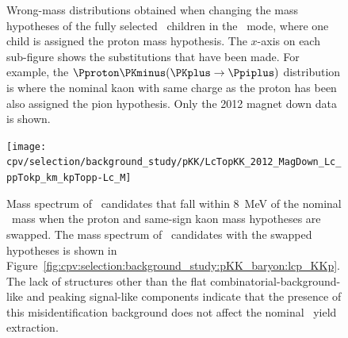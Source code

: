 \begin{figure}
  \caption{%
    Wrong-mass distributions obtained when changing the mass hypotheses of the 
    fully selected \PLambdac\ children in the \pKK\ mode, where one child is 
    assigned the proton mass hypothesis.
    The $x$-axis on each sub-figure shows the substitutions that have been 
    made.
    For example, the ${\Pproton\PKminus(\PKplus \to \Ppiplus)}$ distribution is where the 
    nominal kaon with same charge as the proton has been also assigned the pion 
    hypothesis.
    Only the 2012 magnet down data is shown.
  }
  \label{fig:cpv:selection:background_study:pKK_baryon}
\end{figure}

\begin{figure}
  \centering
  \texttt{[image: cpv/selection/background\_study/pKK/LcTopKK\_2012\_MagDown\_Lc\_ppTokp\_km\_kpTopp-Lc\_M]}
  \caption{%
    Mass spectrum of \pKK\ candidates that fall within \SI{8}{\MeV} of the 
    nominal \PLambdac\ mass when the proton and same-sign kaon mass hypotheses 
    are swapped.
    The mass spectrum of \PLambdac\ candidates with the swapped hypotheses is 
    shown in 
    Figure~\ref{fig:cpv:selection:background_study:pKK_baryon:lcp_KKp}.
    The lack of structures other than the flat combinatorial-background-like 
    and peaking signal-like components indicate that the presence of this 
    misidentification background does not affect the nominal \pKK\ yield 
    extraction.
  }
  \label{fig:cpv:selection:background_study:pKK_lcp_KKp_Lc_M}
\end{figure}


